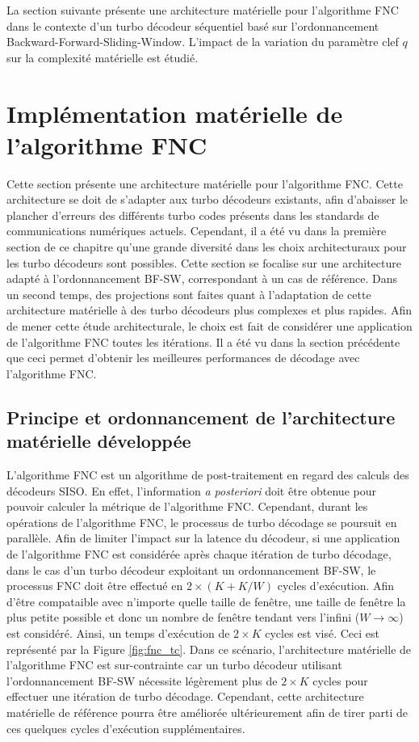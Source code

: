 La section suivante présente une architecture matérielle pour l'algorithme FNC dans le contexte d'un turbo décodeur 
séquentiel basé sur l'ordonnancement Backward-Forward-Sliding-Window. L'impact de 
la variation du paramètre clef $q$ sur la complexité matérielle est étudié. 


\section{Implémentation matérielle de l'algorithme FNC}
Cette section présente une architecture matérielle pour l'algorithme FNC. Cette architecture se doit de 
s'adapter aux turbo décodeurs existants, afin d’abaisser le plancher d'erreurs des différents turbo codes présents dans 
les standards de communications numériques actuels. Cependant, il a été vu dans la première section de ce chapitre qu'une 
grande diversité dans les choix architecturaux pour les turbo décodeurs sont possibles. Cette section se focalise sur 
 une architecture adapté à l'ordonnancement BF-SW, correspondant à un cas de référence. Dans un second temps, des projections
 sont faites quant à l'adaptation de cette architecture matérielle à des turbo décodeurs plus 
complexes et plus rapides. 
Afin de mener cette étude architecturale, 
le choix est fait de considérer une application de l'algorithme FNC toutes les itérations. Il a été vu dans la section 
précédente que ceci permet d'obtenir les meilleures performances de décodage avec l'algorithme FNC.

\subsection{Principe et ordonnancement de l'architecture matérielle développée}
L'algorithme FNC est un algorithme de post-traitement en regard des calculs des décodeurs SISO. En effet, l'information 
\textit{a posteriori} doit être obtenue pour pouvoir calculer la métrique de l'algorithme FNC. Cependant, durant les 
opérations de l'algorithme FNC, le processus de turbo décodage se poursuit en parallèle. 
Afin de 
limiter l'impact sur la latence du décodeur, si une application de l'algorithme FNC est considérée après chaque 
itération de turbo décodage, dans le cas d'un turbo décodeur exploitant un ordonnancement BF-SW, 
le processus FNC doit être effectué en $2\times (K+K/W)$ cycles d’exécution. Afin d'être compataible avec n'importe quelle taille de 
fenêtre, une taille de fenêtre la plus petite possible et donc un nombre de fenêtre tendant vers l'infini ($W\rightarrow \infty$)
est considéré. Ainsi, un temps d'exécution de $2\times K$ cycles est visé.
Ceci est 
représenté par la Figure \ref{fig:fnc_tc}. Dans ce scénario, l'architecture matérielle de l'algorithme FNC est sur-contrainte 
car un turbo décodeur utilisant l'ordonnancement BF-SW nécessite légèrement plus de $2\times K$ cycles pour 
effectuer une itération de turbo décodage. Cependant, cette architecture matérielle de référence pourra 
être améliorée ultérieurement afin de tirer parti de ces quelques cycles d'exécution supplémentaires. 


